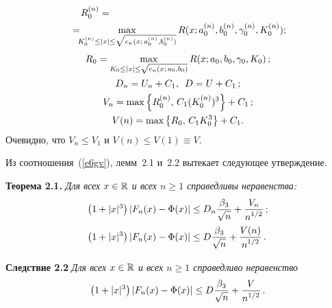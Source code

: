 \begin{multicols}{2}
\noindent
\begin{multline*}
R^{(n)}_0={}\hspace*{60mm}\\
=\!\!\!\max_{K^{(n)}_0\le|x|\le\sqrt{c_n(x;\,a^{(n)}_0,b^{(n)}_0)}}R(x;a^{(n)}_0,b^{(n)}_0,\gamma^{(n)}_0,K^{(n)}_0);\hspace*{-2.76pt}
\end{multline*}
\begin{gather*}
R_0=\max_{K_0\le|x|\le\sqrt{c_n(x;\,a_0,b_0)}}R(x;a_0,b_0,\gamma_0,K_0)\,;
\\
D_n=U_n+C_1,\enskip D=U+C_1\,;
\\
V_n=\max\left\{R^{(n)}_0,\,C_1(K^{(n)}_0)^{3}\right\}+C_1\,;
\\
V(n)=\max\left\{R_0,\,C_1 K_0^{3}\right\}+C_1.
\end{gather*}
Очевидно, что $V_n\le V_1$ и $V(n)\le V(1)\equiv V$.

Из соотношения~(\ref{e6gv}), лемм~2.1 и~2.2 вытекает следующее утверждение.

\medskip

\noindent
\textbf{Теорема 2.1.} \textit{Для всех $x\in\mathbb R$ и всех $n\ge1$
справедливы неравенства:}
\begin{align*}
\left(1+|x|^{3}\right)\left|F_n(x)-\Phi(x)\right|&\le
D_n\displaystyle\frac{\displaystyle \beta_{3}\mathstrut}{\displaystyle \sqrt{n}\mathstrut}+\displaystyle\frac{\displaystyle V_n\mathstrut}{\displaystyle n^{1/2}\mathstrut}\,;
\\
\left(1+|x|^{3}\right)\left|F_n(x)-\Phi(x)\right|&\le
D\displaystyle\frac{\displaystyle \beta_{3}\mathstrut}{\displaystyle \sqrt{n}\mathstrut}+\displaystyle\frac{\displaystyle V(n)\mathstrut}{\displaystyle n^{1/2}\mathstrut}\,.
\end{align*}

\medskip

\noindent
\textbf{Следствие 2.2} \textit{Для всех $x\in\mathbb R$ и всех $n\ge1$
справедливо неравенство}
$$
\left(1+|x|^{3}\right)\left|F_n(x)-\Phi(x)\right|\le
D\displaystyle\frac{\displaystyle \beta_{3}\mathstrut}{\displaystyle \sqrt{n}\mathstrut}+\displaystyle\frac{\displaystyle V\mathstrut}{\displaystyle n^{1/2}\mathstrut}\,.
$$

\medskip


\end{multicols}
